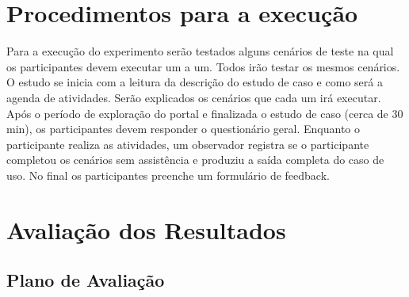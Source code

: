 \begin{table}[h]
\begin{tabular}{|l|l|l|l|}
\end{tabular}
\end{table}

\section{Procedimentos para a execução}

Para a execução do experimento serão testados alguns cenários de teste na qual os participantes devem executar um a um. Todos irão testar os mesmos cenários.
O estudo se inicia com a leitura da descrição do estudo de caso e como será a agenda de atividades. Serão explicados os cenários que cada um irá executar.
Após o período de exploração do portal e finalizada o estudo de caso (cerca de 30 min), os participantes devem responder o questionário geral.
Enquanto o participante realiza as atividades, um observador registra se o participante completou os cenários sem assistência e produziu a saída completa do caso de uso.
No final os participantes preenche um formulário de feedback.

\section{Avaliação dos Resultados}

\subsection{Plano de Avaliação}

